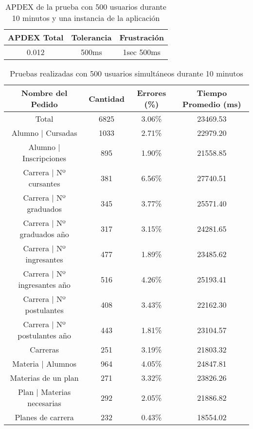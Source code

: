 \begin{table}[]
    \centering
    \makegapedcells
    \begin{tabular}{|c|c|c}
    \hline
    APDEX Total & Tolerancia & Frustración\\ \hline
    0.012 & 500ms & 1sec 500ms \\ \hline
    \end{tabular}
    \caption{APDEX de la prueba con 500 usuarios durante 10 minutos y una instancia de la aplicación}
    \label{tab:tabla_planes}
\end{table}



\begin{table}[]
    \centering
    \makegapedcells
    \begin{tabular}{|c|c|c|c|}
    \hline
    Nombre del Pedido & Cantidad & Errores (\%) & Tiempo Promedio (ms) \\ \hline
    Total & 6825 & 3.06\% & 23469.53 \\ \hline
    Alumno | Cursadas & 1033 & 2.71\% & 22979.20 \\ \hline
    Alumno | Inscripciones & 895 & 1.90\% & 21558.85\\ \hline
    Carrera | Nº cursantes & 381 & 6.56\% & 27740.51\\ \hline
    Carrera | Nº graduados & 345 & 3.77\% & 25571.40\\ \hline
    Carrera | Nº graduados año & 317 & 3.15\% & 24281.65\\ \hline
    Carrera | Nº ingresantes & 477 & 1.89\% & 23485.62\\ \hline
    Carrera | Nº ingresantes año & 516 & 4.26\% & 25193.41\\ \hline
    Carrera | Nº postulantes & 408 & 3.43\% & 22162.30\\ \hline
    Carrera | Nº postulantes año & 443 & 1.81\% & 23104.57\\ \hline
    Carreras & 251 & 3.19\% & 21803.32\\ \hline
    Materia | Alumnos & 964 & 4.05\% & 24847.81\\ \hline
    Materias de un plan & 271 & 3.32\% & 23826.26\\ \hline
    Plan | Materias necesarias & 292 & 2.05\% & 21886.82\\ \hline
    Planes de carrera & 232 & 0.43\% & 18554.02\\ \hline

    \end{tabular}
    \caption{Pruebas realizadas con 500 usuarios simultáneos durante 10 minutos}
    \label{tab:tabla_planes}
\end{table}

